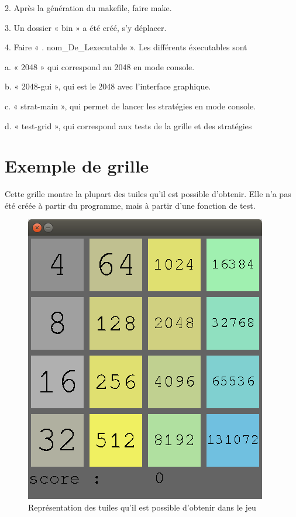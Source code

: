 \documentclass[12pt]{report}
\begin{document}
2. Après la génération du makefile, faire make.

3. Un dossier « bin » a été créé, s’y déplacer.

4. Faire « .\/ nom\_De\_Lexecutable ». Les différents éxecutables sont

a. « 2048 » qui correspond au 2048 en mode console.

b. « 2048-gui », qui est le 2048 avec l’interface graphique.

c. « strat-main », qui permet de lancer les stratégies en mode console.

d. « test-grid », qui correspond aux tests de la grille et des stratégies
\section{Exemple de grille}
Cette grille montre la plupart des tuiles qu’il est possible d’obtenir. Elle n’a pas été créée à partir du programme, mais à partir d’une fonction de test.
\begin{figure}
\center
\includegraphics[scale = 0.5]{2048.png}
\caption{Représentation des tuiles qu'il est possible d'obtenir dans le jeu}
\end{figure}
\end{document}
